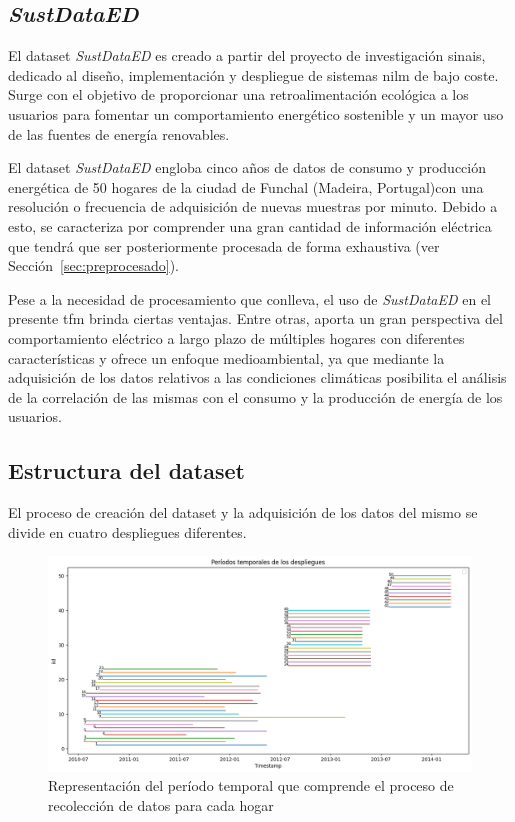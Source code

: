 \clearpage

\subsection{\textit{SustDataED}}

El dataset \textit{SustDataED} \cite{sustdata} es creado a partir del proyecto de investigación \gls{sinais}, dedicado al diseño, implementación y despliegue de sistemas \gls{nilm} de bajo coste. Surge con el objetivo de proporcionar una retroalimentación ecológica a los usuarios para fomentar un comportamiento energético sostenible y un mayor uso de las fuentes de energía renovables.

\vspace{3mm}

El dataset \textit{SustDataED} engloba cinco años de datos de consumo y producción energética de 50 hogares de la ciudad de Funchal (Madeira, Portugal)con una resolución o frecuencia de adquisición de nuevas muestras por minuto. Debido a esto, se caracteriza por comprender una gran cantidad de información eléctrica que tendrá que ser posteriormente procesada de forma exhaustiva (ver Sección~\ref{sec:preprocesado}).

\vspace{3mm}

Pese a la necesidad de procesamiento que conlleva, el uso de \textit{SustDataED} en el presente \gls{tfm} brinda ciertas ventajas. Entre otras, aporta un gran perspectiva del comportamiento eléctrico a largo plazo de múltiples hogares con diferentes características y ofrece un enfoque medioambiental, ya que mediante la adquisición de los datos relativos a las condiciones climáticas posibilita el análisis de la correlación de las mismas con el consumo y la producción de energía de los usuarios.

\subsection{Estructura del dataset}

El proceso de creación del dataset y la adquisición de los datos del mismo se divide en cuatro despliegues diferentes. 

\begin{figure}[h!]
    \centering
    \includegraphics[width=1\textwidth]{img/diseno/despliegues.png}
    \caption{Representación del período temporal que comprende el proceso de recolección de datos para cada hogar}
    \label{fig:bigdata2}
\end{figure}


